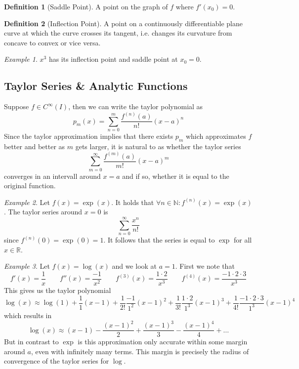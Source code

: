 \documentclass[english,titlepage]{uzhpub}
\theoremstyle{definition}
\newtheorem{definition}{Definition}[section]
\theoremstyle{plain}
\theoremstyle{remark}
\theoremstyle{example}
\newtheorem*{example}{Example}
\begin{document}
   \begin{definition}[Saddle Point]
      A point on the graph of \(f\) where \(f'(x_0) = 0\).
   \end{definition}

   \begin{definition}[Inflection Point]
      A point on a continuously differentiable plane curve at which the curve crosses its tangent, i.e. changes its curvature from concave to convex or vice versa.
   \end{definition}
   \begin{example}
      \(x^3\) has its inflection point and saddle point at \(x_0 = 0\).
      \begin{center}
         
      \end{center}
   \end{example}

   \subsection{Taylor Series \& Analytic Functions}
   Suppose \(f \in C^\infty(I)\), then we can write the taylor polynomial as
   \[p_m(x) = \sum_{n=0}^m \frac{f^{(n)}(a)}{n!}(x - a)^n\]
   Since the taylor approximation implies that there exists \(p_m\) which approximates \(f\) better and better as \(m\) gets larger, it is natural to as whether the taylor series
   \[\sum_{m=0}^\infty \frac{f^{(m)}(a)}{m!}(x-a)^m\]
   converges in an intervall around \(x = a\) and if so, whether it is equal to the original function.

   \begin{example}
      Let \(f(x) = \exp(x)\).
      It holds that \(\forall n \in \mathbb{N}: f^{(n)}(x) = \exp(x)\).
      The taylor series around \(x = 0\) is
      \[\sum_{n=0}^\infty \frac{x^n}{n!}\]
      since \(f^{(n)}(0) = \exp(0) = 1\).
      It follows that the series is equal to \(\exp\) for all \(x \in \mathbb{R}\).
   \end{example}

   \begin{example}
      Let \(f(x) = \log(x)\) and we look at \(a = 1\).
      First we note that
      \[f'(x) = \frac{1}{x} \qquad f''(x) = \frac{-1}{x^2} \qquad f^{(3)}(x) = \frac{1 \cdot 2}{x^3} \qquad f^{(4)}(x) = \frac{-1 \cdot 2 \cdot 3}{x^3}\]
      This gives us the taylor polynomial
      \[\log(x) \approx \log(1) + \frac{1}{1}(x-1) + \frac{1}{2!}\frac{-1}{1^2}(x-1)^2 + \frac{1}{3!}\frac{1 \cdot 2}{1^3}(x-1)^3 + \frac{1}{4!}\frac{-1 \cdot 2 \cdot 3}{1^3}(x-1)^4\]
      which results in
      \[\log(x) \approx (x-1) - \frac{(x-1)^2}{2} + \frac{(x-1)^3}{3} - \frac{(x-1)^4}{4} + \ldots\]
      But in contrast to \(\exp\) is this approximation only accurate within some margin around \(a\), even with infinitely many terms.
      This margin is precisely the radius of convergence of the taylor series for \(\log\).

      \begin{center}
         
      \end{center}
   \end{example}
\end{document}
